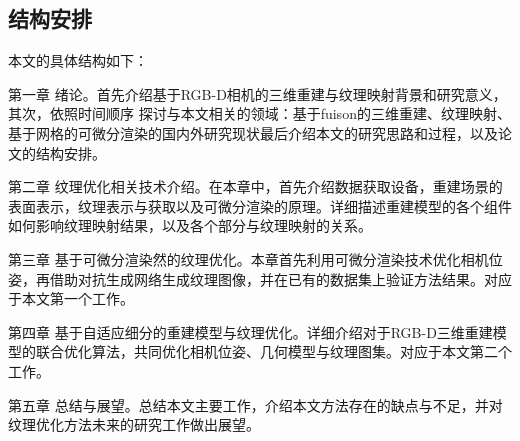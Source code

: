 \subsection{结构安排}


本文的具体结构如下： \par
第一章 绪论。首先介绍基于RGB-D相机的三维重建与纹理映射背景和研究意义，其次，依照时间顺序
探讨与本文相关的领域：基于fuison的三维重建、纹理映射、基于网格的可微分渲染的国内外研究现状最后介绍本文的研究思路和过程，以及论文的结构安排。\par
第二章 纹理优化相关技术介绍。在本章中，首先介绍数据获取设备，重建场景的表面表示，纹理表示与获取以及可微分渲染的原理。详细描述重建模型的各个组件如何影响纹理映射结果，以及各个部分与纹理映射的关系。\par

第三章 基于可微分渲染然的纹理优化。本章首先利用可微分渲染技术优化相机位姿，再借助对抗生成网络生成纹理图像，并在已有的数据集上验证方法结果。对应于本文第一个工作。\par

第四章 基于自适应细分的重建模型与纹理优化。详细介绍对于RGB-D三维重建模型的联合优化算法，共同优化相机位姿、几何模型与纹理图集。对应于本文第二个工作。\par

第五章 总结与展望。总结本文主要工作，介绍本文方法存在的缺点与不足，并对纹理优化方法未来的研究工作做出展望。

